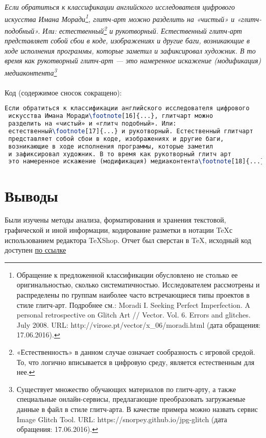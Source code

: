 \documentclass[a4paper]{article}
\begin{document}
\emph{Если обратиться к классификации английского исследователя цифрового искусства Имана Моради\footnote[16]{Обращение к предложенной классификации обусловлено не столько ее оригинальностью, сколько систематичностью. Исследователем рассмотрены и распределены по группам наиболее часто встречающиеся типы проектов в стиле глитч-арт. Подробнее см.: Moradi I. Seeking Perfect Imperfection. A personal retrospective on Glitch Art // Vector. Vol. 6. Errors and glitches. July 2008. URL: http://virose.pt/vector/x\_06/moradi.html (дата обращения: 17.06.2016).}, глитч-арт можно разделить на «чистый» и «глитч-подобный». Или: естественный\footnote[17]{«Естественность» в данном случае означает сообразность с игровой средой. То, что логично вписывается в цифровую среду, является естественным для нее.} и рукотворный. Естественный глитч-арт представляет собой сбои в коде, изображениях и другие баги, возникающие в ходе исполнения программы, которые заметил и зафиксировал художник. В то время как рукотворный глитч-арт — это намеренное искажение (модификация) медиаконтента\footnote[18]{Существует множество обучающих материалов по глитч-арту, а также специальные онлайн-сервисы, предлагающие преобразовать загружаемые данные в файл в стиле глитч-арта. В качестве примера можно назвать сервис Image Glitch Tool. URL: https://snorpey.github.io/jpg-glitch (дата обращения: 17.06.2016).} }\\\\
\hfill\break
Код (содержимое сносок сокращено):\\
\begin{lstlisting}[language=TeX]
 Если обратиться к классификации английского исследователя цифрового 
 искусства Имана Моради\footnote[16]{...}, глитчарт можно 
 разделить на «чистый» и «глитч подобный». Или: 
 естественный\footnote[17]{...} и рукотворный. Естественный глитчарт 
 представляет собой сбои в коде, изображениях и другие баги, 
 возникающие в ходе исполнения программы, которые заметил 
 и зафиксировал художник. В то время как рукотворный глитч арт  
 это намеренное искажение (модификация) медиаконтента\footnote[18]{...}
\end{lstlisting}
\thispagestyle{empty}
\newpage
\section{Выводы}
Были изучены методы анализа, форматирования и хранения текстовой, графической и иной информации, кодирование разметки в нотации \TeX с использованием редактора \TeX Shop. Отчет был сверстан в \TeX, исходный код доступен \href{https://artguide.com/posts/1251}{по ссылке}
\end{document}
